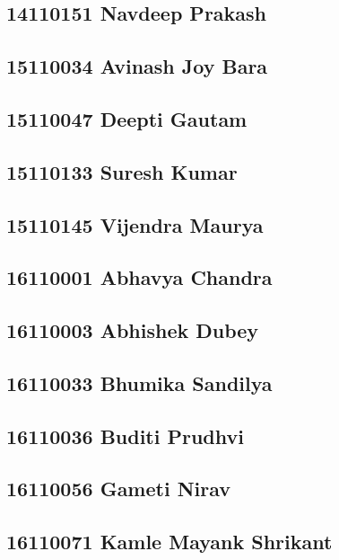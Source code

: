 \documentclass[journal=jpcbfk,manuscript=article]{achemso}
\begin{document}
\subsection {14110151	Navdeep Prakash}

\subsection {15110034	Avinash Joy Bara}

\subsection {15110047	Deepti Gautam}

\subsection {15110133	Suresh Kumar}

\subsection {15110145	Vijendra Maurya}

\subsection {16110001	Abhavya Chandra}

\subsection {16110003	Abhishek Dubey}

\subsection {16110033	Bhumika Sandilya}

\subsection {16110036	Buditi Prudhvi}

\subsection {16110056	Gameti Nirav}

\subsection {16110071	Kamle Mayank Shrikant}
\end{document}
